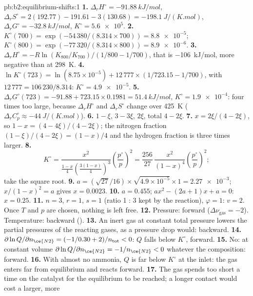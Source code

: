 \begin{solution}{pb:b2:equilibrium-shifts:1}
\textbf{1.} $\Delta_r H^\circ = \qty{-91.88}{kJ/mol}$, $\Delta_r S^\circ =
2(192.77) - 191.61 - 3(130.68) = \qty{-198.1}{J/(K.mol)}$, $\Delta_r G^\circ =
\qty{-32.8}{kJ/mol}$, $K^\circ = \num{5.6e5}$.
\textbf{2.} $K^\circ(700) = \exp(-54\,380/(8.314 \times 700)) = \num{8.8e-5}$;
$K^\circ(800) = \exp(-77\,320/(8.314 \times 800)) = \num{8.9e-6}$.
\textbf{3.} $\Delta_r H^\circ = -R\ln(K_{800}/K_{700})/(1/800 - 1/700)$,
that is \qty{-106}{kJ/mol}, more negative than at \qty{298}{K}.
\textbf{4.} $\ln K^\circ(723) = \ln(8.75 \times 10^{-5}) + 12\,777 \times
(1/723.15 - 1/700)$, with $12\,777 = 106\,230/8.314$: $K^\circ =
\num{4.9e-5}$.
\textbf{5.} $\Delta_r G^\circ(723) = -91.88 + 723.15 \times 0.1981 =
\qty{51.4}{kJ/mol}$, $K^\circ = \num{1.9e-4}$: four times too large, because
$\Delta_r H^\circ$ and $\Delta_r S^\circ$ change over \qty{425}{K}
($\Delta_r C_p^\circ \approx \qty{-44}{J/(K.mol)}$).
\textbf{6.}  $1 - \xi$,  $3 - 3\xi$,  $2\xi$, total $4 -
2\xi$.
\textbf{7.} $x = 2\xi/(4 - 2\xi)$, so $1 - x = (4 - 4\xi)/(4 - 2\xi)$; the
nitrogen fraction $(1 - \xi)/(4 - 2\xi) = (1 - x)/4$ and the hydrogen fraction
is three times larger.
\textbf{8.}
\[
  K^\circ = \frac{x^2}{\frac{1-x}{4}\left(\frac{3(1-x)}{4}\right)^3}
  \left(\frac{p^\circ}{p}\right)^2 = \frac{256}{27}\,\frac{x^2}{(1 - x)^4}
  \left(\frac{p^\circ}{p}\right)^2 ;
\]
take the square root.
\textbf{9.} $a = (\sqrt{27}/16) \times \sqrt{4.9 \times 10^{-5}} \times 1 =
\num{2.27e-3}$; $x/(1 - x)^2 = a$ gives $x = 0.0023$.
\textbf{10.} $a = 0.455$; $ax^2 - (2a + 1)x + a = 0$: $x = 0.25$.
\textbf{11.} $n = 3$, $r = 1$, $s = 1$ (ratio 1 : 3 kept by the reaction),
$\varphi = 1$: $v = 2$. Once $T$ and $p$ are chosen, nothing is left free.
\textbf{12.} Pressure: forward ($\Delta\nu_{\text{gas}} = -2$). Temperature:
backward ().
\textbf{13.} An inert gas at constant total pressure lowers the partial
pressures of the reacting gases, as a pressure drop would: backward.
\textbf{14.} $\partial\ln Q/\partial n_{\ce{N2}} = (-1/0.30 + 2)/n_{\text{tot}} < 0$:
$Q$ falls below $K^\circ$, forward.
\textbf{15.} No: at constant volume $\partial\ln Q/\partial n_{\ce{N2}} =
-1/n_{\ce{N2}} < 0$ whatever the composition: forward.
\textbf{16.} With almost no ammonia, $Q$ is far below $K^\circ$ at the inlet:
the gas enters far from equilibrium and reacts forward.
\textbf{17.} The gas spends too short a time on the catalyst for the
equilibrium to be reached; a longer contact would cost a larger, more

\end{solution}

